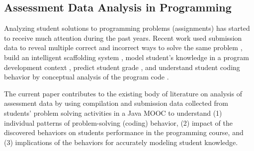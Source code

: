 \documentclass{sigchi}
\begin{document}
\subsection {Assessment Data Analysis in Programming}
Analyzing student solutions to programming problems (assignments) has started to receive much attention during the past years. %
Recent work used submission data to reveal multiple correct and incorrect ways to solve the same problem \cite{huang2013syntactic,glassman2015overcode}, build an intelligent scaffolding system \cite{rivers2013automatic}, model student's knowledge in a program development context \cite{piech2012modeling,yudelson2014investigating}, predict student  %
grade \cite{murphy2009retina}, and understand student coding behavior %
by conceptual analysis of the program code \cite{Hosseini2014Psychology}.

The current paper contributes to the existing body of literature on analysis of assessment data by using compilation and submission data collected from students' problem solving activities in a Java MOOC to understand (1) individual patterns of problem-solving (coding) behavior, (2) impact of the discovered behaviors on students performance in the programming course, and (3) implications of the behaviors for accurately modeling student knowledge. 
\end{document}
